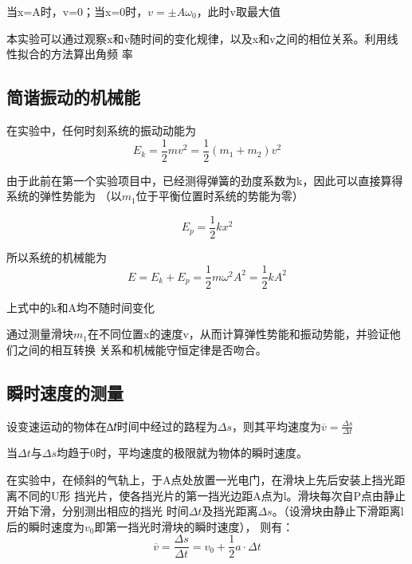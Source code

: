 \documentclass[11pt,a4paper]{article}
\begin{document}
    当x=A时，v=0；当x=0时，$v =  \pm A{\omega _0}$，此时v取最大值

    本实验可以通过观察x和v随时间的变化规律，以及x和v之间的相位关系。利用线性拟合的方法算出角频
    率

    \subsection{简谐振动的机械能}
    在实验中，任何时刻系统的振动动能为
    \begin{equation}
        {E_k} = \frac{1}{2}m{v^2} = \frac{1}{2}\left( {{m_1} + {m_2}} \right){v^2}
    \end{equation}

    由于此前在第一个实验项目中，已经测得弹簧的劲度系数为k，因此可以直接算得系统的弹性势能为
    （以$m_1$位于平衡位置时系统的势能为零）

    \begin{equation}
        {E_p} = \frac{1}{2}k{x^2}
    \end{equation}

    所以系统的机械能为
    \begin{equation}
        E = {E_k} + {E_p} = \frac{1}{2}m{\omega ^2}{A^2} = \frac{1}{2}k{A^2}
    \end{equation}

    上式中的k和A均不随时间变化

    通过测量滑块$m_1$在不同位置x的速度v，从而计算弹性势能和振动势能，并验证他们之间的相互转换
    关系和机械能守恒定律是否吻合。

    \subsection{瞬时速度的测量}
    设变速运动的物体在∆𝑡时间中经过的路程为$\Delta s$，则其平均速度为$\overline v  = \frac{{\Delta s}}{{\Delta t}}$

    当$\Delta t$与$\Delta s$均趋于0时，平均速度的极限就为物体的瞬时速度。

    在实验中，在倾斜的气轨上，于A点处放置一光电门，在滑块上先后安装上挡光距离不同的U形
    挡光片，使各挡光片的第一挡光边距A点为l。滑块每次自P点由静止开始下滑，分别测出相应的挡光
    时间$\Delta t$及挡光距离$\Delta s$。（设滑块由静止下滑距离l后的瞬时速度为$v_0$即第一挡光时滑块的瞬时速度），
    则有：
    \begin{equation}
        \overline v  = \frac{{\Delta s}}{{\Delta t}} = {v_0} + \frac{1}{2}a \cdot \Delta t
    \end{equation}
\end{document}
